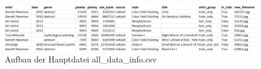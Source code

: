 \begin{figure}[H]
	\centerline{\includegraphics[width=1.0\linewidth]{figures/datensatz.png}}
	\caption{Aufbau der Hauptdatei all\_data\_info.csv}
	\label{datensatz}
\end{figure}